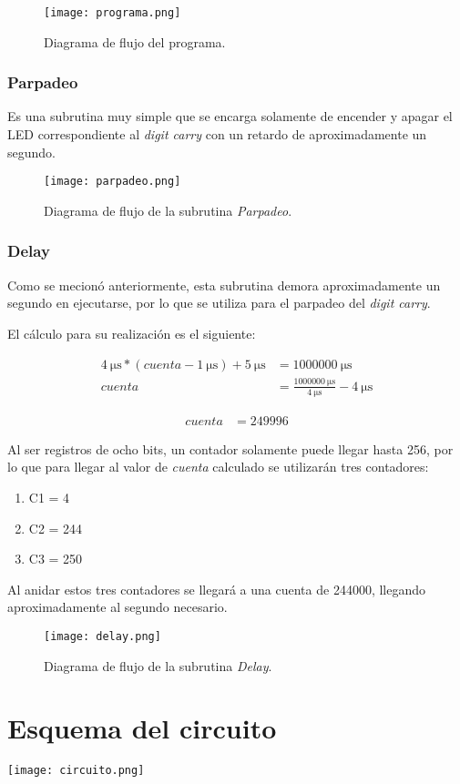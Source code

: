 \documentclass[12pt,a4paper]{article}
\begin{document}
	\begin{figure}[H]
	\texttt{[image: programa.png]}
	\centering
	\caption{Diagrama de flujo del programa.}
	\end{figure}		
	
	\subsubsection{Parpadeo}
	Es una subrutina muy simple que se encarga solamente de encender y apagar el LED correspondiente al \emph{digit carry} con un retardo de aproximadamente un segundo.
	
	\begin{figure}[H]
	\texttt{[image: parpadeo.png]}
	\centering
	\caption{Diagrama de flujo de la subrutina \emph{Parpadeo}.}
	\end{figure}		
	
	\newpage
	\subsubsection{Delay}
	Como se mecionó anteriormente, esta subrutina demora aproximadamente un segundo en ejecutarse, por lo que se utiliza para el parpadeo del \emph{digit carry}.
	
	El cálculo para su realización es el siguiente:
	
	\begin{align*}
	\SI{4}{\micro \second} * (cuenta - \SI{1}{\micro \second}) + \SI{5}{\micro \second} &=  \SI{1000000}{\micro \second} \\
	cuenta &= \frac{\SI{1000000}{\micro \second}}{\SI{4}{\micro \second}} - \SI{4}{\micro \second}
	\end{align*}
	
	\begin{align}
	cuenta &= 249996
	\end{align}
	
	Al ser registros de ocho bits, un contador solamente puede llegar hasta 256, por lo que para llegar al valor de \emph{cuenta} calculado se utilizarán tres contadores:
	
	\begin{enumerate}[leftmargin=1.5cm,nosep]
	\item C1 = 4
	\item C2 = 244
	\item C3 = 250
	\end{enumerate}
	
	Al anidar estos tres contadores se llegará a una cuenta de 244000, llegando aproximadamente al segundo necesario.
	
	\begin{figure}[H]
	\texttt{[image: delay.png]}
	\centering
	\caption{Diagrama de flujo de la subrutina \emph{Delay}.}
	\end{figure}		
	
\newpage
\section{Esquema del circuito}

\texttt{[image: circuito.png]}
	
\end{document}
